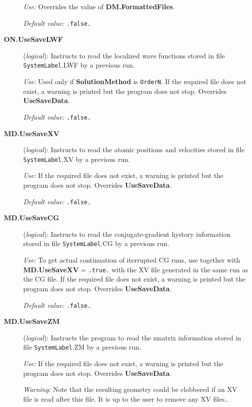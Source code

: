 \documentclass[11pt]{article}
\begin{document}
\begin{description}
{\it Use:} Overrides the value of {\bf DM.FormattedFiles}.

{\it Default value:} {\tt .false.}


\item[{\bf ON.UseSaveLWF}] ({\it logical}): 
Instructs to read the localized wave functions stored in file
{\tt SystemLabel}.LWF by a previous run.

{\it Use:} Used only if {\bf SolutionMethod} is {\tt OrderN}.
If the required file does not exist, a warning is
printed but the program does not stop. Overrides {\bf UseSaveData}.

{\it Default value:} {\tt .false.}

 
\item[{\bf MD.UseSaveXV}] ({\it logical}):
Instructs to read the atomic positions and velocities stored
in file {\tt SystemLabel}.XV by a previous run.
 
{\it Use:} If the required file does not exist, a warning is
printed but the program does not stop. Overrides {\bf UseSaveData}.
 
{\it Default value:} {\tt .false.}


\item[{\bf MD.UseSaveCG}] ({\it logical}): 
Instructs to read the conjugate-gradient hystory information stored
in file {\tt SystemLabel}.CG by a previous run.

{\it Use:} To get actual continuation of iterrupted CG runs, use
together with {\bf MD.UseSaveXV} = {\tt .true.} with the XV
file generated in the same run as the CG file.
If the required file does not exist, a warning is
printed but the program does not stop. Overrides {\bf UseSaveData}.

{\it Default value:} {\tt .false.}
        

\item[{\bf MD.UseSaveZM}] ({\it logical}): 
Instructs the program to read the zmatrix information stored
in file {\tt SystemLabel}.ZM by a previous run.

{\it Use:} If the required file does not exist, a warning is
printed but the program does not stop. Overrides {\bf UseSaveData}.

{\it Warning:} Note that the resulting geometry could be clobbered if
an XV file is read after this file. It is up to the user to remove
any XV files..


\end{description}
\end{document}

